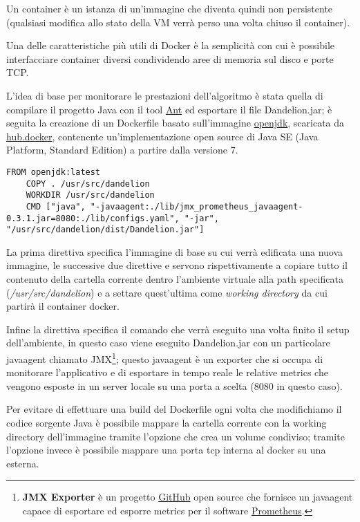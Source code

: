 Un container è un istanza di un'immagine che diventa quindi non persistente (qualsiasi modifica allo stato della VM verrà perso una volta chiuso il container). 

Una delle caratteristiche più utili di Docker è la semplicità con cui è possibile interfacciare container diversi condividendo aree di memoria sul disco e porte TCP.

L'idea di base per monitorare le prestazioni dell'algoritmo è stata quella di compilare il progetto Java con il tool \href{https://ant.apache.org/}{Ant} ed esportare il file Dandelion.jar; 
è seguita la creazione di un Dockerfile basato sull'immagine \href{https://hub.docker.com/_/openjdk/}{openjdk}, 
scaricata da \href{https://hub.docker.com/}{hub.docker}, contenente un'implementazione open source di Java SE (Java Platform, Standard Edition) a partire dalla versione 7. 

\begin{lstlisting}[style=YmlStyle, caption=Dockerfile]
    FROM openjdk:latest
    COPY . /usr/src/dandelion
    WORKDIR /usr/src/dandelion
    CMD ["java", "-javaagent:./lib/jmx_prometheus_javaagent-0.3.1.jar=8080:./lib/configs.yaml", "-jar", "/usr/src/dandelion/dist/Dandelion.jar"]
\end{lstlisting}

La prima direttiva  specifica l'immagine di base su cui verrà edificata una nuova immagine, le successive due direttive  e  servono rispettivamente a copiare 
tutto il contenuto della cartella corrente dentro l'ambiente virtuale alla path specificata (\textit{/usr/src/dandelion}) e a settare quest'ultima come \textit{working directory} da cui partirà il container docker. 

Infine la direttiva  specifica il comando che verrà eseguito una volta finito il setup dell'ambiente, in questo caso viene eseguito Dandelion.jar con un particolare javaagent chiamato JMX\footnote{
    \textbf{JMX Exporter} è un progetto \href{https://github.com/prometheus/jmx_exporter}{GitHub} open source che fornisce un javaagent capace di esportare ed esporre metrics per il software \href{https://prometheus.io/}{Prometheus}.
};
questo javaagent è un exporter che si occupa di monitorare l'applicativo e di esportare in tempo reale le relative metrics che vengono esposte in un server locale su una porta a scelta (8080 in questo caso).

Per evitare di effettuare una build del Dockerfile ogni volta che modifichiamo il codice sorgente Java è possibile mappare la cartella corrente con la working directory dell'immagine tramite l'opzione 
che crea un volume condiviso; tramite l'opzione  invece è possibile mappare una porta tcp interna al docker su una esterna.

